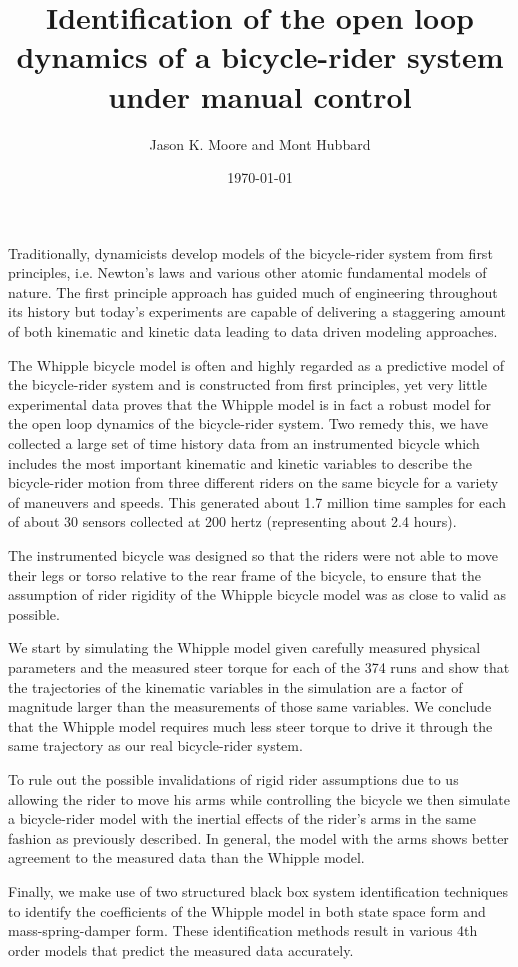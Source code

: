\documentclass{article}
\title{Identification of the open loop dynamics of a bicycle-rider system
under manual control}
\author{Jason K. Moore and Mont Hubbard}
\date{\today}
\begin{document}
\maketitle

Traditionally, dynamicists develop models of the bicycle-rider system from
first principles, i.e. Newton's laws and various other atomic fundamental
models of nature. The first principle approach has guided much of engineering
throughout its history but today's experiments are capable of delivering a
staggering amount of both kinematic and kinetic data leading to data driven
modeling approaches.

The Whipple bicycle model is often and highly regarded as a predictive model of
the bicycle-rider system and is constructed from first principles, yet very
little experimental data proves that the Whipple model is in fact a robust
model for the open loop dynamics of the bicycle-rider system. Two remedy this,
we have collected a large set of time history data from an instrumented bicycle
which includes the most important kinematic and kinetic variables to describe
the bicycle-rider motion from three different riders on the same bicycle for a
variety of maneuvers and speeds. This generated about 1.7 million time samples
for each of about 30 sensors collected at 200 hertz (representing about 2.4
hours).

The instrumented bicycle was designed so that the riders were not able to move
their legs or torso relative to the rear frame of the bicycle, to ensure that
the assumption of rider rigidity of the Whipple bicycle model was as close to
valid as possible.

We start by simulating the Whipple model given carefully measured physical
parameters and the measured steer torque for each of the 374 runs and show that
the trajectories of the kinematic variables in the simulation are a factor of
magnitude larger than the measurements of those same variables. We conclude
that the Whipple model requires much less steer torque to drive it through the
same trajectory as our real bicycle-rider system.

To rule out the possible invalidations of rigid rider assumptions due to us
allowing the rider to move his arms while controlling the bicycle we then
simulate a bicycle-rider model with the inertial effects of the rider's arms in
the same fashion as previously described. In general, the model with the arms
shows better agreement to the measured data than the Whipple model.

Finally, we make use of two structured black box system identification
techniques to identify the coefficients of the Whipple model in both state
space form and mass-spring-damper form. These identification methods result in
various 4th order models that predict the measured data accurately.
\end{document}
